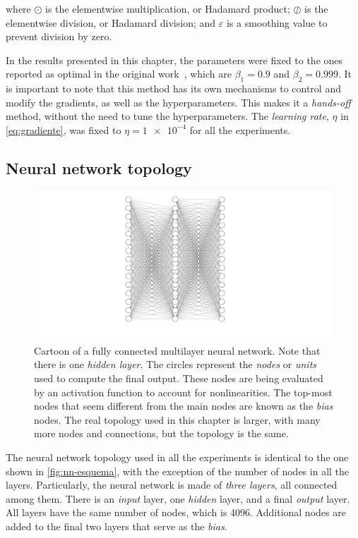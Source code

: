 where $\odot$ is the elementwise multiplication, or Hadamard product; $\oslash$
is the elementwise division, or Hadamard division; and $\varepsilon$ is a smoothing
value to prevent division by zero.

In the results presented in this chapter, the parameters were fixed to the ones reported
as optimal in the original work~\cite{kingmaAdamMethodStochastic2017}, which are
$\beta_1=\num{0.9}$ and $\beta_2=\num{0.999}$. It is important to note that this method
has its own mechanisms to control and modify the gradients, as well as the hyperparameters.
This makes it a \emph{hands-off} method, without the need to tune the hyperparameters.
The \emph{learning rate}, $\eta$ in \autoref{eq:gradiente}, was fixed to
$\eta=\num{1e-4}$ for all the experiments.

\subsection{Neural network topology}

\begin{figure}[t]
    \includegraphics[width=\textwidth]{figuras/capitulo-3/neural-network.pdf}
    \vspace{-1.5cm}
    \caption[General schematics of a neural network.]{Cartoon of a fully connected multilayer neural network. Note that there is one \emph{hidden layer}. The circles represent the \emph{nodes} or \emph{units} used to compute the final output. These nodes are being evaluated by an activation function to account for nonlinearities. The top-most nodes that seem different from the main nodes are known as the \emph{bias} nodes. The real topology used in this chapter is larger, with many more nodes and connections, but the topology is the same.}
    \label{fig:nn-esquema}
\end{figure}

The neural network topology used in all the experiments is identical to the one
shown in \autoref{fig:nn-esquema}, with the exception of the number of nodes in all the
layers.
Particularly, the neural network is made of \emph{three layers}, all connected among them.
There is an \emph{input} layer, one \emph{hidden} layer, and a final \emph{output} layer.
All layers have the same number of nodes, which is 4096. Additional nodes are added to the
final two layers that serve as the \emph{bias}.

